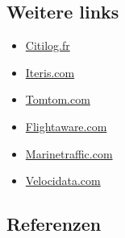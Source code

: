 \documentclass[
]{book}
\providecommand{\tightlist}{%
  \setlength{\itemsep}{0pt}\setlength{\parskip}{0pt}}
\begin{document}
\hypertarget{weitere-links-9}{%
\subsection*{Weitere links}\label{weitere-links-9}}

\begin{itemize}
\tightlist
\item
  \href{https://www.citilog.fr}{Citilog.fr}
\item
  \href{https://www.iteris.com}{Iteris.com}
\item
  \href{https://www.tomtom.com/products/real-time-traffic/}{Tomtom.com}
\item
  \href{https://de.flightaware.com/live/}{Flightaware.com}
\item
  \href{https://www.marinetraffic.com/en/ais/home/centerx:12.3/centery:45.7/zoom:5}{Marinetraffic.com}
\item
  \href{https://velocidata.com/technical-summary/}{Velocidata.com}
\end{itemize}

\hypertarget{referenzen-11}{%
\subsection*{Referenzen}\label{referenzen-11}}
\end{document}
